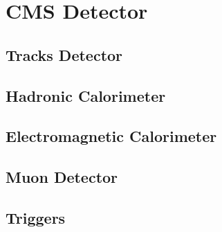\chapter{CMS Detector}

\section{Tracks Detector}

\section{Hadronic Calorimeter}

\section{Electromagnetic Calorimeter}

\section{Muon Detector}

\section{Triggers}